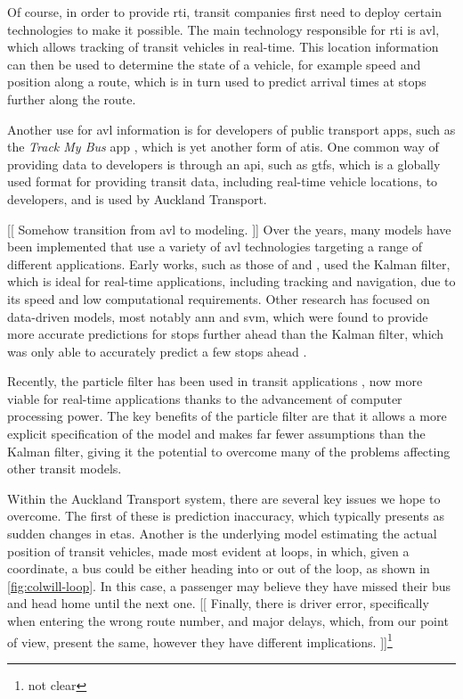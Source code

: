 \documentclass[12pt,a4paper]{article}
\newcommand{\kf}{Kalman filter}
\newcommand{\pf}{particle filter}
\begin{document}
Of course, in order to provide \gls{rti},
transit companies first need to deploy certain technologies to make it possible.
The main technology responsible for \gls{rti} is \gls{avl},
which allows tracking of transit vehicles in real-time.
This location information can then be used to determine the state of a vehicle,
for example speed and position along a route,
which is in turn used to predict arrival times at stops further along the route.


Another use for \gls{avl} information is for developers of public transport apps,
such as the \emph{Track My Bus} app \citep{trackmybus},
which is yet another form of \gls{atis}.
One common way of providing data to developers is through an \gls{api},
such as \gls{gtfs}, which is a globally used format for providing transit data,
including real-time vehicle locations, to developers,
and is used by Auckland Transport.


[[ Somehow transition from \gls{avl} to modeling. ]]
Over the years, many models have been implemented that use a variety of \gls{avl} technologies
targeting a range of different applications.
Early works, such as those of \cite{wall-dailey:1999} and \cite{dailey:2001},
used the \kf{}, which is ideal for real-time applications, including tracking and navigation,
due to its speed and low computational requirements.
Other research has focused on data-driven models,
most notably \gls{ann} and \gls{svm},
which were found to provide more accurate predictions for stops further ahead
than the \kf{}, which was only able to accurately predict a few stops ahead
\citep{cn}.


Recently, the \pf{} has been used in transit applications \citep{cn},
now more viable for real-time applications thanks to the advancement of
computer processing power.
The key benefits of the \pf{} are that it allows a more explicit specification of the model
and makes far fewer assumptions than the \kf{},
giving it the potential to overcome many of the problems affecting other transit models.


Within the Auckland Transport system, there are several key issues we hope to overcome.
The first of these is prediction inaccuracy,
which typically presents as sudden changes in \glspl{eta}.
Another is the underlying model estimating the actual position of transit vehicles,
made most evident at loops, in which, given a coordinate,
a bus could be either heading into or out of the loop,
as shown in \cref{fig:colwill-loop}.
In this case, a passenger may believe they have missed their bus and head home until the next one.
[[ Finally, there is driver error, specifically when entering the wrong route number,
and major delays, which,
from our point of view, present the same,
however they have different implications. ]]\footnote{not clear}
\end{document}
